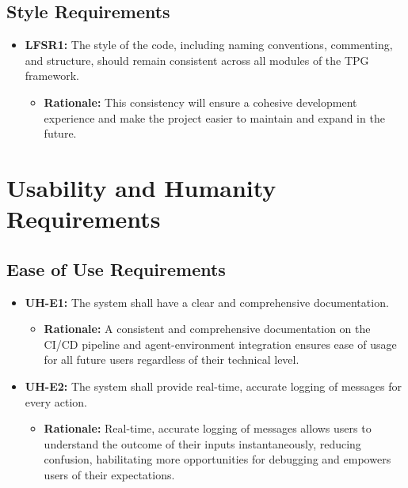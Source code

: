 \documentclass[12pt]{article}
\begin{document}
\subsection{Style Requirements}


\begin{itemize}
  \item \textbf{LFSR1:}  The style of the code, including naming conventions, commenting, and structure, should remain consistent across all modules of the TPG framework.

      \begin{itemize}
        \item \textbf{Rationale:} This consistency will ensure a cohesive development experience and make the project easier to maintain and expand in the future.
      \end{itemize}
\end{itemize}


\section{Usability and Humanity Requirements}
\subsection{Ease of Use Requirements}
\begin{itemize}
  \item \textbf{UH-E1:} The system shall have a clear and comprehensive documentation.
  \begin{itemize}
    \item \textbf{Rationale:} A consistent and comprehensive documentation on the CI/CD pipeline and agent-environment integration ensures ease of usage for all future users regardless of their technical level.
  \end{itemize}
  \item \textbf{UH-E2:} The system shall provide real-time, accurate logging of messages for every action.
  \begin{itemize}
    \item \textbf{Rationale:} Real-time, accurate logging of messages allows users to understand the outcome of their inputs instantaneously, reducing confusion, habilitating more opportunities for debugging and empowers users of their expectations.
  \end{itemize}
\end{itemize}
\end{document}
